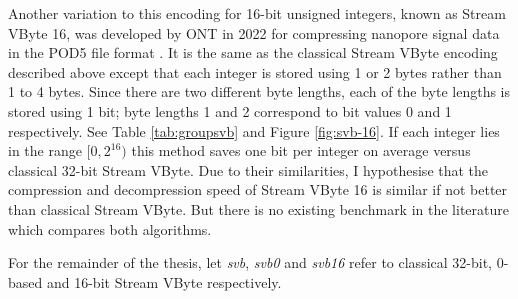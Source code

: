 %



Another variation to this encoding for 16-bit unsigned integers, known as Stream VByte 16, was developed by ONT in 2022 for compressing nanopore signal data in the POD5 file format \cite{pod5}. It is the same as the classical Stream VByte encoding described above except that each integer is stored using 1 or 2 bytes rather than 1 to 4 bytes. Since there are two different byte lengths, each of the byte lengths is stored using 1 bit; byte lengths 1 and 2 correspond to bit values 0 and 1 respectively. See Table \ref{tab:groupsvb} and Figure \ref{fig:svb-16}. If each integer lies in the range $[0, 2^{16})$ this method saves one bit per integer on average versus classical 32-bit Stream VByte. Due to their similarities, I hypothesise that the compression and decompression speed of Stream VByte 16 is similar if not better than classical Stream VByte. But there is no existing benchmark in the literature which compares both algorithms.




For the remainder of the thesis, let \textit{svb}, \textit{svb0} and
\textit{svb16} refer to classical 32-bit, 0-based and 16-bit Stream VByte
respectively.
